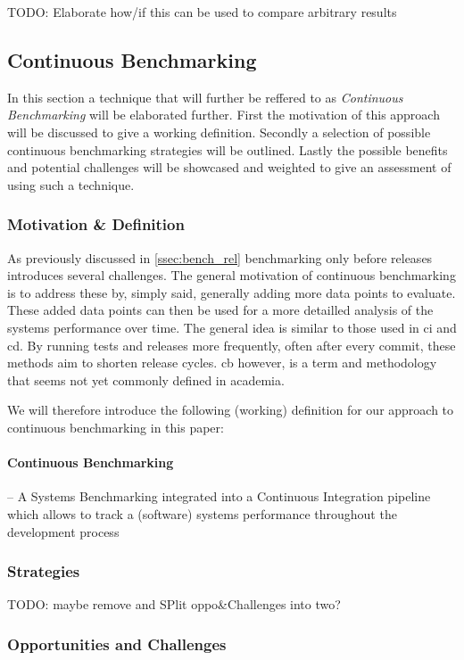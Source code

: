 \documentclass[	runningheads,
				a4paper]{llncs}
\begin{document}
TODO: Elaborate how/if this can be used to compare arbitrary results

	\subsection{Continuous Benchmarking}
In this section a technique that will further be reffered to as \textit{Continuous Benchmarking} will be elaborated further. First the motivation of this approach will be discussed to give a working definition. Secondly a selection of possible continuous benchmarking strategies will be outlined. Lastly the possible benefits and potential challenges will be showcased and weighted to give an assessment of using such a technique.

	\subsubsection{Motivation \& Definition}
	As previously discussed in \autoref{ssec:bench_rel} benchmarking only before releases introduces several challenges. The general motivation of continuous benchmarking is to address these by, simply said, generally adding more data points to evaluate. These added data points can then be used for a more detailled analysis of the systems performance over time. The general idea is similar to those used in \gls{ci} and \gls{cd}. By running tests and releases more frequently, often after every commit, these methods aim to shorten release cycles. \gls{cb} however, is a term and methodology that seems not yet commonly defined in academia.

	We will therefore introduce the following (working) definition for our approach to continuous benchmarking in this paper:
	\paragraph{Continuous Benchmarking} -- A Systems Benchmarking integrated into a Continuous Integration pipeline which allows to track a (software) systems performance throughout the development process

	\subsubsection{Strategies}
	TODO: maybe remove and SPlit oppo\&Challenges into two?


		\subsubsection{Opportunities and Challenges}
\end{document}
